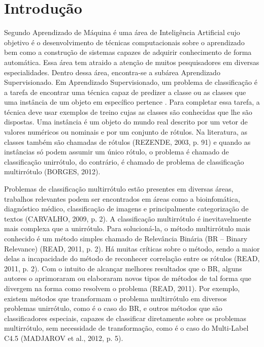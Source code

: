 \newcommand{\NbasesV}{\textit{N}}
\newcommand{\Nbases}{6}
\newcommand{\Nml}{6}
\newcommand{\NmlT}{5}
\newcommand{\NmlA}{2}
\newcommand{\Ncb}{4}
\newcommand{\MML}{método multirrótulo}
\newcommand{\MMLs}{métodos multirrótulo}
\newcommand{\MRLM}{Recursive Dependent Binary Relevance}
\newcommand{\MRLMa}{RDBR}

\newcommand{\legendaTab}[2]{Desempenho dos métodos multirrótulos com \textit{#2} medido pela métrica \textit{#1} }
\newcommand{\jqo}{J48}
\newcommand{\EBA}{Example Based Accuracy}
\newcommand{\SA}{\textit{Subset Accuracy}}

\chapter{Introdução}
Segundo \cite{rezende2003sistemas} Aprendizado de Máquina é uma área de Inteligência Artificial
cujo objetivo é o desenvolvimento de técnicas computacionais
sobre o aprendizado bem como a construção de sistemas capazes de adquirir
conhecimento de forma automática. Essa área tem atraido a atenção de muitos 
pesquisadores em diversas especialidades. Dentro dessa área, encontra-se a subárea Aprendizado Supervisionado.
Em Aprendizado Supervisionado, um problema de classificação é a tarefa de encontrar
uma técnica capaz de predizer a classe ou as classes que uma instância de
um objeto em específico pertence \cite{rezende2003sistemas}.
Para completar essa tarefa, a técnica deve usar exemplos de treino cujas as classes
são conhecidas que lhe são dispostas. Uma instância é um objeto do mundo real descrito
por um vetor de valores numéricos ou nominais e por um conjunto de rótulos.
Na literatura, as classes também são chamadas de rótulos (REZENDE, 2003, p. 91)
e quando as instâncias só podem assumir um único rótulo, o problema é chamado de classificação unirrótulo,
do contrário, é chamado de problema de classificação multirrótulo (BORGES, 2012).

Problemas de classificação multirrótulo estão presentes em diversas áreas, trabalhos relevantes podem
ser encontrados em áreas como a bioinfomática, diagnóstico médico, classificação de imagens e principalmente
categorização de textos (CARVALHO, 2009, p. 2). A classificação multirrótulo é inevitavelmente
mais complexa que a unirrótulo. Para solucioná-la,  o método multirrótulo mais conhecido é um método simples chamado de
Relevância Binária (BR – Binary Relevance) (READ, 2011, p. 2). 
Há muitas críticas sobre o método, sendo a maior delas a incapacidade do método de reconhecer correlação entre os rótulos (READ, 2011, p. 2).
Com o intuito de alcançar melhores resultados que o BR, alguns autores o aprimoraram ou elaboraram novos tipos de métodos
de tal forma que divergem na forma como resolvem o problema (READ, 2011). 
Por exemplo, existem métodos que transformam o problema multirrótulo em
diversos problemas unirrótulo, como é o caso do BR, e outros métodos que são classificadores especiais, capazes de classificar diretamente sobre os problemas multirrótulo, sem necessidade de transformação, como é o caso do Multi-Label C4.5 (MADJAROV et al., 2012, p. 5). 

